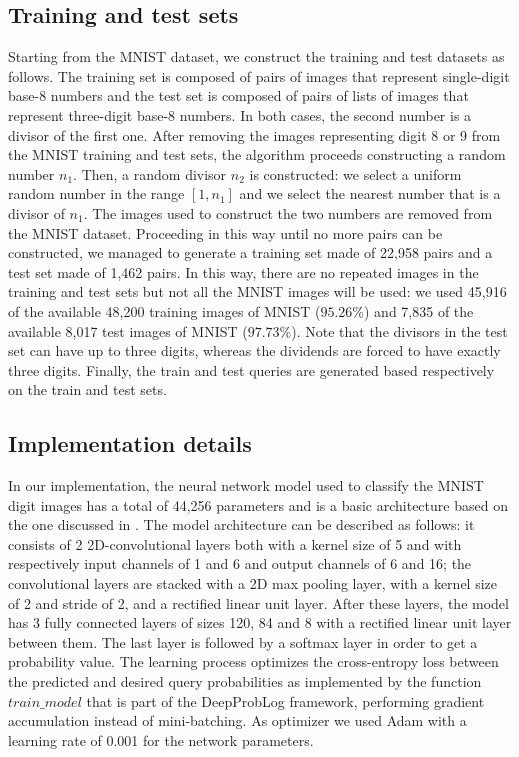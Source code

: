 \subsection{Training and test sets}
Starting from the MNIST dataset, we construct the training and test datasets as follows. The training set is composed of pairs of images that represent single-digit base-8 numbers and the test set is composed of pairs of lists of images that represent three-digit base-8 numbers. In both cases, the second number is a divisor of the first one.
After removing the images representing digit 8 or 9 from the MNIST training and test sets, the algorithm proceeds constructing a random number $n_1$. Then, a random divisor $n_2$ is constructed: we select a uniform random number in the range $[1,n_1]$ and we select the nearest number that is a divisor of $n_1$. The images used to construct the two numbers are removed from the MNIST dataset. Proceeding in this way until no more pairs can be constructed, we managed to generate a training set made of 22,958 pairs and a test set made of 1,462 pairs.
In this way, there are no repeated images in the training and test sets but not all the MNIST images will be used: we used 45,916 of the available 48,200 training images of MNIST ($95.26\%$) and 7,835 of the available 8,017 test images of MNIST ($97.73\%$). Note that the divisors in the test set can have up to three digits, whereas the dividends are forced to have exactly three digits.
Finally, the train and test queries are generated based respectively on the train and test sets. %

\subsection{Implementation details}
In our implementation, the neural network model used to classify the MNIST digit images has a total of 44,256 parameters and is a basic architecture based on the one discussed in \cite{MNIST_CNN}. The model architecture can be described as follows: it consists of 2 2D-convolutional layers both with a kernel size of 5 and with respectively input channels of 1 and 6 and output channels of 6 and 16; the convolutional layers are stacked with a 2D max pooling layer, with a kernel size of 2 and stride of 2, and a rectified linear unit layer.
After these layers, the model has 3 fully connected layers of sizes 120, 84 and 8 with a rectified linear unit layer between them. The last layer is followed by a softmax layer in order to get a probability value.
The learning process optimizes the cross-entropy loss between the predicted and desired query probabilities as implemented by the function $train\_model$ that is part of the DeepProbLog framework, performing gradient accumulation instead of mini-batching.
As optimizer we used Adam with a learning rate of 0.001 for the network parameters. %


